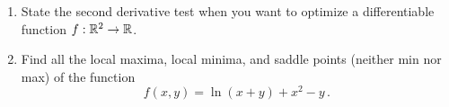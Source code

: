 \documentclass[12pt]{article}
\begin{document}
\newpage

\begin{problem}
    \begin{enumerate}
        \item State the second derivative test when you want to optimize a differentiable function $f:\mathbb{R}^2 \to \mathbb{R}$.
        \item Find all the local maxima, local minima, and saddle points (neither min nor max) of the function
    \begin{equation*}
        f(x,y) = \ln(x+y) + x^2 - y \,.
    \end{equation*}
    \end{enumerate}
\end{problem}
%
\end{document}
